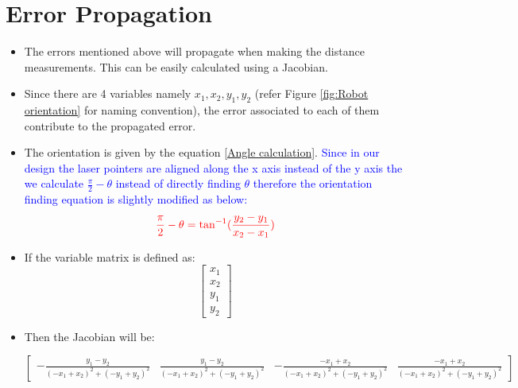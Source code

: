     \section{Error Propagation}
    {
        \begin{itemize}
            \item The errors mentioned above will propagate when making the distance measurements. This can be easily calculated using a Jacobian.
            
            \item Since there are 4 variables namely $x_1,x_2,y_1,y_2$ (refer Figure \ref{fig:Robot orientation} for naming convention), the error associated to each of them contribute to the propagated error.
            
            \item The orientation is given by the equation \ref{Angle calculation}. \textcolor{blue}{Since in our design the laser pointers are aligned along the x axis instead of the y axis the we calculate  $\frac{\pi}{2}-\theta$ instead of directly finding $\theta$ therefore the orientation finding equation is slightly modified as below:}
            \begin{equation}\label{Angle calculation}
                \textcolor{red}{\frac{\pi}{2}-\theta=\tan^{-1}(\frac{y_2-y_1}{x_2-x_1})}
            \end{equation}
            
            \item If the variable matrix is defined as:
            \begin{equation}\label{Variable Matrix}
                \begin{bmatrix}x_{1}\\x_{2}\\y_{1}\\y_{2}\end{bmatrix}
            \end{equation}
            
            \item Then the Jacobian will be:
          
            
            
           $$ \begin{bmatrix}\label{Jacobian}- \frac{y_{1} - y_{2}}{\left(- x_{1} + x_{2}\right)^{2} + \left(- y_{1} + y_{2}\right)^{2}} & \frac{y_{1} - y_{2}}{\left(- x_{1} + x_{2}\right)^{2} + \left(- y_{1} + y_{2}\right)^{2}} & - \frac{- x_{1} + x_{2}}{\left(- x_{1} + x_{2}\right)^{2} + \left(- y_{1} + y_{2}\right)^{2}} & \frac{- x_{1} + x_{2}}{\left(- x_{1} + x_{2}\right)^{2} + \left(- y_{1} + y_{2}\right)^{2}}\end{bmatrix}
           $$
           

\end{itemize}}

